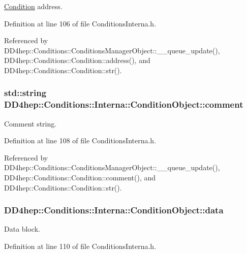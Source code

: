\hyperlink{class_d_d4hep_1_1_conditions_1_1_condition}{Condition} address. 

Definition at line 106 of file ConditionsInterna.h.

Referenced by DD4hep::Conditions::ConditionsManagerObject::\_\-\_\-queue\_\-update(), DD4hep::Conditions::Condition::address(), and DD4hep::Conditions::Condition::str().\hypertarget{class_d_d4hep_1_1_conditions_1_1_interna_1_1_condition_object_a4bd162e79c142737fd279493329bae42}{
\subsubsection[{comment}]{\setlength{\rightskip}{0pt plus 5cm}std::string {\bf DD4hep::Conditions::Interna::ConditionObject::comment}}}
\label{class_d_d4hep_1_1_conditions_1_1_interna_1_1_condition_object_a4bd162e79c142737fd279493329bae42}


Comment string. 

Definition at line 108 of file ConditionsInterna.h.

Referenced by DD4hep::Conditions::ConditionsManagerObject::\_\-\_\-queue\_\-update(), DD4hep::Conditions::Condition::comment(), and DD4hep::Conditions::Condition::str().\hypertarget{class_d_d4hep_1_1_conditions_1_1_interna_1_1_condition_object_a049350e2cf3f94aa39a04edd0a18a018}{
\subsubsection[{data}]{ {\bf DD4hep::Conditions::Interna::ConditionObject::data}}}
\label{class_d_d4hep_1_1_conditions_1_1_interna_1_1_condition_object_a049350e2cf3f94aa39a04edd0a18a018}


Data block. 

Definition at line 110 of file ConditionsInterna.h.

